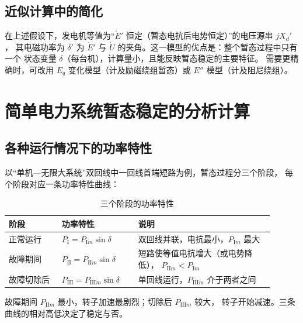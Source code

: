 \subsection{近似计算中的简化}

在上述假设下，发电机等值为“$\dot E'$ 恒定（暂态电抗后电势恒定）”的电压源串 $jX_d'$，
其电磁功率为
$\delta'$ 为 $\dot E'$ 与 $\dot U$ 的夹角。这一模型的优点是：整个暂态过程中只有一个
状态变量 $\delta$（每台机），计算量小，且能反映暂态稳定的主要特征。
需要更精确时，可改用 $E_q$ 变化模型（计及励磁绕组暂态）或 $E''$ 模型（计及阻尼绕组）。

\section{简单电力系统暂态稳定的分析计算}

\subsection{各种运行情况下的功率特性}

以“单机—无限大系统”双回线中一回线首端短路为例，暂态过程分三个阶段，
每个阶段对应一条功率特性曲线：

\begin{table}[htbp]
  \centering
  \caption{三个阶段的功率特性}
  \small
  \begin{tabular}{@{}p{0.18\linewidth}p{0.26\linewidth}p{0.46\linewidth}@{}}
    \toprule
    阶段 & 功率特性 & 说明 \\
    \midrule
    正常运行 & $P_{\text{I}}=P_{\text{I}m}\sin\delta$ & 双回线并联，电抗最小，$P_{\text{I}m}$ 最大 \\
    故障期间 & $P_{\text{II}}=P_{\text{II}m}\sin\delta$ & 短路使等值电抗增大（或电势降低），
      $P_{\text{II}m}<P_{\text{I}m}$ \\
    故障切除后 & $P_{\text{III}}=P_{\text{III}m}\sin\delta$ & 单回线运行，$P_{\text{III}m}$ 介于两者之间 \\
    \bottomrule
  \end{tabular}
\end{table}

故障期间 $P_{\text{II}m}$ 最小，转子加速最剧烈；切除后 $P_{\text{III}m}$ 较大，
转子开始减速。三条曲线的相对高低决定了稳定与否。

